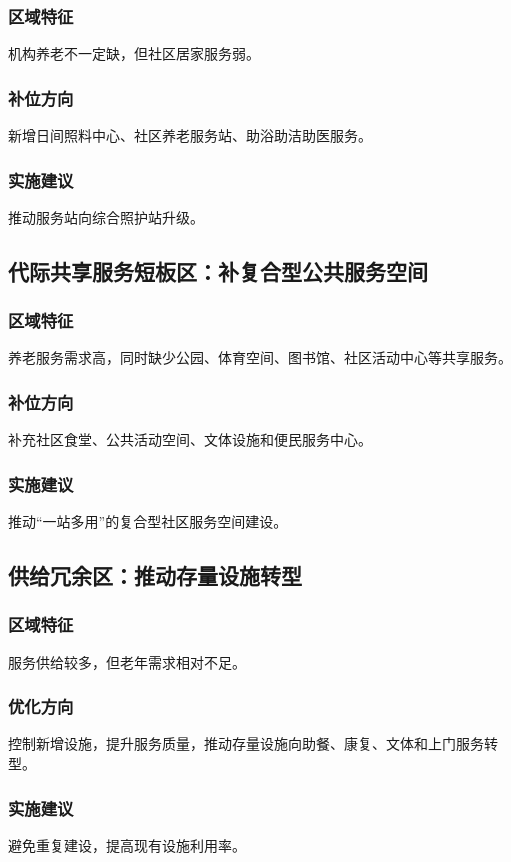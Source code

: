 \subsubsection{区域特征}

机构养老不一定缺，但社区居家服务弱。

\subsubsection{补位方向}

新增日间照料中心、社区养老服务站、助浴助洁助医服务。

\subsubsection{实施建议}

推动服务站向综合照护站升级。

\subsection{代际共享服务短板区：补复合型公共服务空间}

\subsubsection{区域特征}

养老服务需求高，同时缺少公园、体育空间、图书馆、社区活动中心等共享服务。

\subsubsection{补位方向}

补充社区食堂、公共活动空间、文体设施和便民服务中心。

\subsubsection{实施建议}

推动“一站多用”的复合型社区服务空间建设。

\subsection{供给冗余区：推动存量设施转型}

\subsubsection{区域特征}

服务供给较多，但老年需求相对不足。

\subsubsection{优化方向}

控制新增设施，提升服务质量，推动存量设施向助餐、康复、文体和上门服务转型。

\subsubsection{实施建议}

避免重复建设，提高现有设施利用率。
